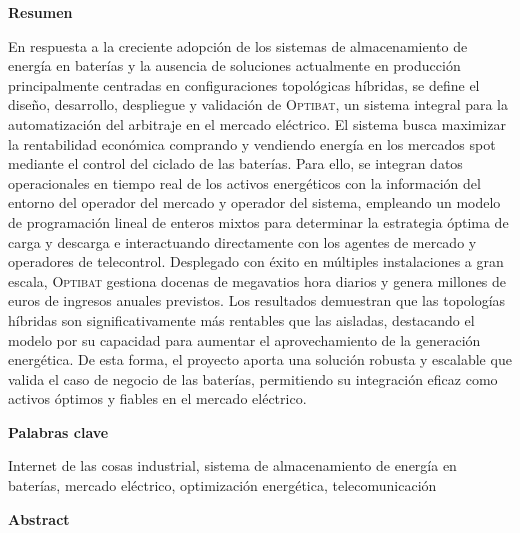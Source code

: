 \newpage

\thispagestyle{empty}

\begin{center}
  {\bf \huge Resumen}
\end{center}

\vspace{1cm}

En respuesta a la creciente adopción de los sistemas de almacenamiento de energía en baterías y la ausencia de soluciones actualmente en producción principalmente centradas en configuraciones topológicas híbridas, se define el diseño, desarrollo, despliegue y validación de \textsc{Optibat}, un sistema integral para la automatización del arbitraje en el mercado eléctrico. El sistema busca maximizar la rentabilidad económica comprando y vendiendo energía en los mercados spot mediante el control del ciclado de las baterías. Para ello, se integran datos operacionales en tiempo real de los activos energéticos con la información del entorno del operador del mercado y operador del sistema, empleando un modelo de programación lineal de enteros mixtos para determinar la estrategia óptima de carga y descarga e interactuando directamente con los agentes de mercado y operadores de telecontrol. Desplegado con éxito en múltiples instalaciones a gran escala, \textsc{Optibat} gestiona docenas de megavatios hora diarios y genera millones de euros de ingresos anuales previstos. Los resultados demuestran que las topologías híbridas son significativamente más rentables que las aisladas, destacando el modelo por su capacidad para aumentar el aprovechamiento de la generación energética. De esta forma, el proyecto aporta una solución robusta y escalable que valida el caso de negocio de las baterías, permitiendo su integración eficaz como activos óptimos y fiables en el mercado eléctrico.

\vspace{1cm}

\begin{center}
  {\bf \large Palabras clave}
\end{center}

\vspace{0.5cm}

Internet de las cosas industrial, sistema de almacenamiento de energía en baterías, mercado eléctrico, optimización energética, telecomunicación

\newpage

\thispagestyle{empty}

\begin{center}
  {\bf \huge Abstract}
\end{center}

